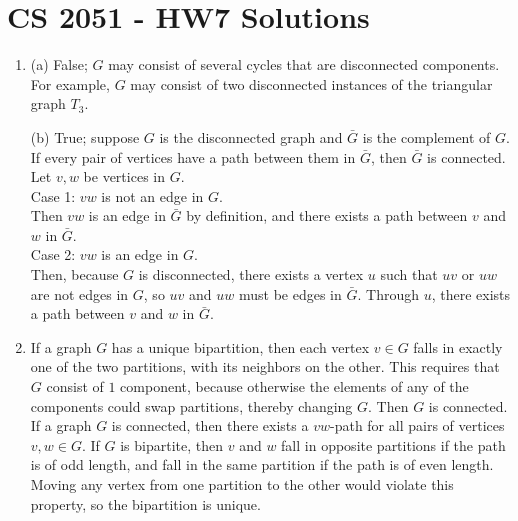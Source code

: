 \documentclass[a4paper,12pt]{article}
\begin{document}
\section*{CS 2051 - HW7 Solutions}

\begin{enumerate}

\item (a) False; $G$ may consist of several cycles that are disconnected components. For example, $G$ may consist of two disconnected instances of the triangular graph $T_3$. \par
(b) True; suppose $G$ is the disconnected graph and $\bar{G}$ is the complement of $G$. If every pair of vertices have a path between them in $\bar{G}$, then $\bar{G}$ is connected. \\
Let $v, w$ be vertices in $G$. \\
Case 1: $vw$ is not an edge in $G$. \\
Then $vw$ is an edge in $\bar{G}$ by definition, and there exists a path between $v$ and $w$ in $\bar{G}$. \\
Case 2: $vw$ is an edge in $G$. \\
Then, because $G$ is disconnected, there exists a vertex $u$ such that $uv$ or $uw$ are not edges in $G$, so $uv$ and $uw$ must be edges in $\bar{G}$. Through $u$, there exists a path between $v$ and $w$ in $\bar{G}$. \par

\item If a graph $G$ has a unique bipartition, then each vertex $v \in G$ falls in exactly one of the two partitions, with its neighbors on the other. This requires that $G$ consist of $1$ component, because otherwise the elements of any of the components could swap partitions, thereby changing $G$. Then $G$ is connected. \\
If a graph $G$ is connected, then there exists a $vw$-path for all pairs of vertices $v, w \in G$. If $G$ is bipartite, then $v$ and $w$ fall in opposite partitions if the path is of odd length, and fall in the same partition if the path is of even length. Moving any vertex from one partition to the other would violate this property, so the bipartition is unique.


\end{enumerate}
\end{document}
